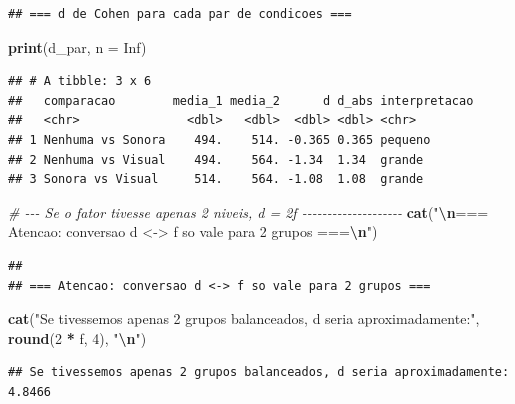 \documentclass[
]{article}
\newenvironment{Shaded}{\begin{snugshade}}{\end{snugshade}}
\newcommand{\AttributeTok}[1]{\textcolor[rgb]{0.13,0.29,0.53}{#1}}
\newcommand{\CommentTok}[1]{\textcolor[rgb]{0.56,0.35,0.01}{\textit{#1}}}
\newcommand{\ConstantTok}[1]{\textcolor[rgb]{0.56,0.35,0.01}{#1}}
\newcommand{\DecValTok}[1]{\textcolor[rgb]{0.00,0.00,0.81}{#1}}
\newcommand{\FunctionTok}[1]{\textcolor[rgb]{0.13,0.29,0.53}{\textbf{#1}}}
\newcommand{\NormalTok}[1]{#1}
\newcommand{\SpecialCharTok}[1]{\textcolor[rgb]{0.81,0.36,0.00}{\textbf{#1}}}
\newcommand{\StringTok}[1]{\textcolor[rgb]{0.31,0.60,0.02}{#1}}
\begin{document}
\begin{verbatim}
## === d de Cohen para cada par de condicoes ===
\end{verbatim}

\begin{Shaded}
\begin{Highlighting}[]
\FunctionTok{print}\NormalTok{(d\_par, }\AttributeTok{n =} \ConstantTok{Inf}\NormalTok{)}
\end{Highlighting}
\end{Shaded}

\begin{verbatim}
## # A tibble: 3 x 6
##   comparacao        media_1 media_2      d d_abs interpretacao
##   <chr>               <dbl>   <dbl>  <dbl> <dbl> <chr>        
## 1 Nenhuma vs Sonora    494.    514. -0.365 0.365 pequeno      
## 2 Nenhuma vs Visual    494.    564. -1.34  1.34  grande       
## 3 Sonora vs Visual     514.    564. -1.08  1.08  grande
\end{verbatim}

\begin{Shaded}
\begin{Highlighting}[]
\CommentTok{\# {-}{-}{-} Se o fator tivesse apenas 2 niveis, d = 2f {-}{-}{-}{-}{-}{-}{-}{-}{-}{-}{-}{-}{-}{-}{-}{-}{-}{-}{-}{-}}
\FunctionTok{cat}\NormalTok{(}\StringTok{"}\SpecialCharTok{\textbackslash{}n}\StringTok{=== Atencao: conversao d \textless{}{-}\textgreater{} f so vale para 2 grupos ===}\SpecialCharTok{\textbackslash{}n}\StringTok{"}\NormalTok{)}
\end{Highlighting}
\end{Shaded}

\begin{verbatim}
## 
## === Atencao: conversao d <-> f so vale para 2 grupos ===
\end{verbatim}

\begin{Shaded}
\begin{Highlighting}[]
\FunctionTok{cat}\NormalTok{(}\StringTok{"Se tivessemos apenas 2 grupos balanceados, d seria aproximadamente:"}\NormalTok{,}
    \FunctionTok{round}\NormalTok{(}\DecValTok{2} \SpecialCharTok{*}\NormalTok{ f, }\DecValTok{4}\NormalTok{), }\StringTok{"}\SpecialCharTok{\textbackslash{}n}\StringTok{"}\NormalTok{)}
\end{Highlighting}
\end{Shaded}

\begin{verbatim}
## Se tivessemos apenas 2 grupos balanceados, d seria aproximadamente: 4.8466
\end{verbatim}
\end{document}
